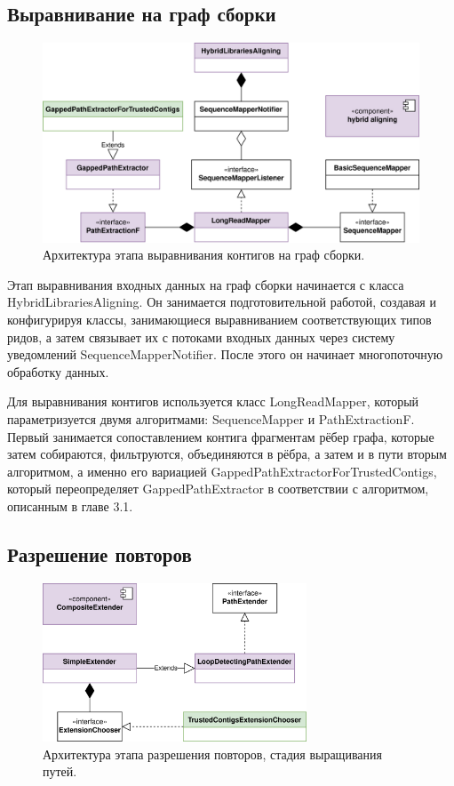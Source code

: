 \documentclass[14pt]{matmex-diploma-custom}
\begin{document}
\subsection{Выравнивание на граф сборки}
\begin{figure}[h]
	\centering
	\includegraphics[width=\textwidth]{mapper.png}
	\caption{Архитектура этапа выравнивания контигов на граф сборки.}
  	\label{fig:mapper}
\end{figure}

Этап выравнивания входных данных на граф сборки начинается с класса HybridLibrariesAligning. Он занимается подготовительной работой, создавая и конфигурируя классы, занимающиеся выравниванием соответствующих типов ридов, а затем связывает их с потоками входных данных через систему уведомлений SequenceMapperNotifier. После этого он начинает многопоточную обработку данных.

\begin{sloppypar}
Для выравнивания контигов используется класс LongReadMapper, который параметризуется двумя алгоритмами: SequenceMapper и PathExtractionF. Первый занимается сопоставлением контига фрагментам рёбер графа, которые затем собираются, фильтруются, объединяются в рёбра, а затем и в пути вторым алгоритмом, а именно его вариацией GappedPathExtractorForTrustedContigs, который переопределяет GappedPathExtractor в соответствии с алгоритмом, описанным в главе 3.1.
\end{sloppypar}

\subsection{Разрешение повторов}
\begin{figure}[h]
	\centering
	\includegraphics[width=0.7\textwidth]{extenders.png}
	\caption{Архитектура этапа разрешения повторов, стадия выращивания путей.}
  	\label{fig:extenders}
\end{figure}
\end{document}
